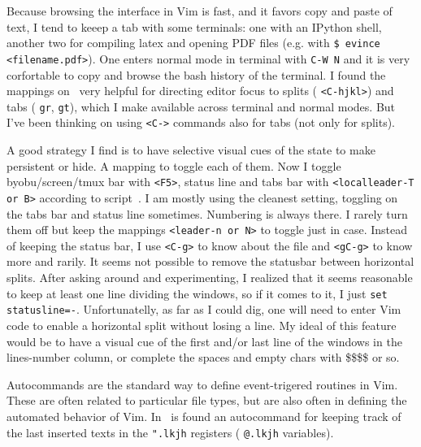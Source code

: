 \documentclass{article}
\newcommand{\ttt}[1] {
	\texttt{<#1>}}
\newcommand{\tttt}[1] {
	\texttt{#1}}
\begin{document}
Because browsing the interface in Vim is fast,
and it favors copy and paste of text,
I tend to keeep a tab with some terminals:
one with an IPython shell, another two for compiling latex
and opening PDF files (e.g. with \tttt{\$ evince <filename.pdf>}).
One enters normal mode in terminal with \tttt{C-W N}
and it is very corfortable to copy and browse the bash history of the
terminal.
I found the mappings on~\cite{vimrc} very helpful for directing
editor focus to splits (\ttt{C-hjkl}) and tabs (\tttt{gr}, \tttt{gt}),
which I make available across terminal and normal modes.
But I've been thinking on using \ttt{C-} commands also
for tabs (not only for splits).

A good strategy I find is to have selective visual cues of the state to make persistent or hide. A mapping to toggle each of them.
Now I toggle byobu/screen/tmux bar with \ttt{F5},
status line and tabs bar with \ttt{localleader-T or B} according to script~\cite{vimrc}.
I am mostly using the cleanest setting, toggling on the tabs bar and status line sometimes. Numbering is always there. I rarely turn them off but keep the mappings \ttt{leader-n or N} to toggle just in case.
Instead of keeping the status bar, I use \ttt{C-g} to know about the
file and \ttt{gC-g} to know more and rarily.
It seems not possible to remove the statusbar between horizontal splits.
After asking around and experimenting, I realized that it seems
reasonable to keep at least one line dividing the windows, so
if it comes to it, I just \tttt{set statusline=-}.
Unfortunatelly, as far as I could dig, one will need to enter
Vim code to enable a horizontal split without losing a line.
My ideal of this feature would be to have a visual cue of the
first and/or last line of the windows in the lines-number
column, or complete the spaces and empty chars with \$\$\$\$ or so.

Autocommands are the standard way to define event-trigered routines in Vim.
These are often related to particular file types, but are also often
in defining the automated behavior of Vim.
In~\cite{vimrc} is found an autocommand for keeping track of the last inserted texts
in the \tttt{".lkjh} registers (\tttt{@.lkjh} variables).
\end{document}
